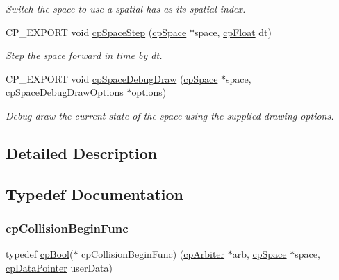 \begin{DoxyCompactItemize}
\begin{DoxyCompactList}\small\item\em Switch the space to use a spatial has as it\textquotesingle{}s spatial index. \end{DoxyCompactList}\item 
\mbox{\label{group__cp_space_gae87c828de2fe3709393ba94046212d80}} 
C\+P\+\_\+\+E\+X\+P\+O\+RT void \mbox{\hyperlink{group__cp_space_gae87c828de2fe3709393ba94046212d80}{cp\+Space\+Step}} (\mbox{\hyperlink{structcp_space}{cp\+Space}} $\ast$space, \mbox{\hyperlink{group__basic_types_gac1ed65573e035bf892505768c852d8d3}{cp\+Float}} dt)
\begin{DoxyCompactList}\small\item\em Step the space forward in time by {\ttfamily dt}. \end{DoxyCompactList}\item 
\mbox{\label{group__cp_space_ga02e8a34681aff3f29bd976e830f3b6da}} 
C\+P\+\_\+\+E\+X\+P\+O\+RT void \mbox{\hyperlink{group__cp_space_ga02e8a34681aff3f29bd976e830f3b6da}{cp\+Space\+Debug\+Draw}} (\mbox{\hyperlink{structcp_space}{cp\+Space}} $\ast$space, \mbox{\hyperlink{structcp_space_debug_draw_options}{cp\+Space\+Debug\+Draw\+Options}} $\ast$options)
\begin{DoxyCompactList}\small\item\em Debug draw the current state of the space using the supplied drawing options. \end{DoxyCompactList}\end{DoxyCompactItemize}


\subsection{Detailed Description}


\subsection{Typedef Documentation}
\mbox{\label{group__cp_space_ga3134f145bfc7ca4ef69b350978c26a5a}} 
\subsubsection{\texorpdfstring{cp\+Collision\+Begin\+Func}{cpCollisionBeginFunc}}
{\footnotesize\ttfamily typedef \mbox{\hyperlink{group__basic_types_gabc5e752c48f3449ca26ef413ecbd647e}{cp\+Bool}}($\ast$ cp\+Collision\+Begin\+Func) (\mbox{\hyperlink{structcp_arbiter}{cp\+Arbiter}} $\ast$arb, \mbox{\hyperlink{structcp_space}{cp\+Space}} $\ast$space, \mbox{\hyperlink{group__basic_types_ga2ac2c3c31e21893941f9e4f8ee279447}{cp\+Data\+Pointer}} user\+Data)}

